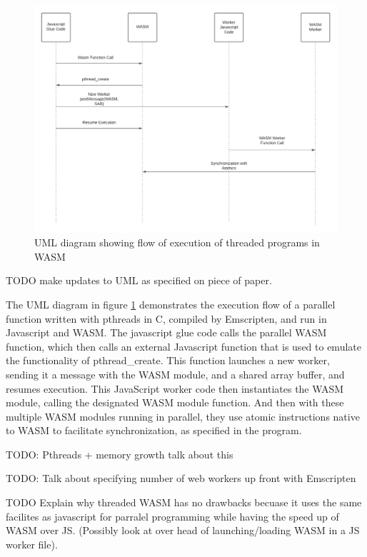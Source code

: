 \documentclass[11pt]{article}
\begin{document}
\begin{figure}[htbp]
\centerline{\includegraphics[scale=0.5]{figures/UML_threaded_wasm.png}}
\caption{UML diagram showing flow of execution of threaded programs in WASM}
\label{uml}
\end{figure}

TODO make updates to UML as specified on piece of paper.

The UML diagram in figure \ref{uml} demonstrates the execution flow of a parallel function written with pthreads in C, compiled by Emscripten, and run in Javascript and WASM. The javascript glue code calls the parallel WASM function, which then calls an external Javascript function that is used to emulate the functionality of pthread\_create. This function launches a new worker, sending it a message with the WASM module, and a shared array buffer, and resumes execution. This JavaScript worker code then  instantiates the WASM module, calling the designated WASM module function. And then with these multiple WASM modules running in parallel, they use atomic instructions native to WASM to facilitate synchronization, as specified in the program.

TODO: Pthreads + memory growth talk about this

TODO: Talk about specifying number of web workers up front with Emscripten

TODO Explain why threaded WASM has no drawbacks becuase it uses the same facilites as javascript for parralel programming while having the speed up of WASM over JS. (Possibly look at over head of launching/loading WASM in a JS worker file).
\end{document}
